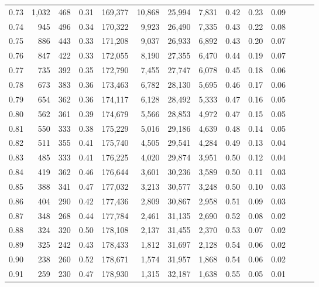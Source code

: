 \begin{tabular}{rrrrrrrrrrrrrr}
0.73 &  1,032 &  468 &  0.31 &  169,377 &   10,868 &  25,994 &   7,831 &  0.42 &  0.23 &      0.09 \\
0.74 &    945 &  496 &  0.34 &  170,322 &    9,923 &  26,490 &   7,335 &  0.43 &  0.22 &      0.08 \\
0.75 &    886 &  443 &  0.33 &  171,208 &    9,037 &  26,933 &   6,892 &  0.43 &  0.20 &      0.07 \\
0.76 &    847 &  422 &  0.33 &  172,055 &    8,190 &  27,355 &   6,470 &  0.44 &  0.19 &      0.07 \\
0.77 &    735 &  392 &  0.35 &  172,790 &    7,455 &  27,747 &   6,078 &  0.45 &  0.18 &      0.06 \\
0.78 &    673 &  383 &  0.36 &  173,463 &    6,782 &  28,130 &   5,695 &  0.46 &  0.17 &      0.06 \\
0.79 &    654 &  362 &  0.36 &  174,117 &    6,128 &  28,492 &   5,333 &  0.47 &  0.16 &      0.05 \\
0.80 &    562 &  361 &  0.39 &  174,679 &    5,566 &  28,853 &   4,972 &  0.47 &  0.15 &      0.05 \\
0.81 &    550 &  333 &  0.38 &  175,229 &    5,016 &  29,186 &   4,639 &  0.48 &  0.14 &      0.05 \\
0.82 &    511 &  355 &  0.41 &  175,740 &    4,505 &  29,541 &   4,284 &  0.49 &  0.13 &      0.04 \\
0.83 &    485 &  333 &  0.41 &  176,225 &    4,020 &  29,874 &   3,951 &  0.50 &  0.12 &      0.04 \\
0.84 &    419 &  362 &  0.46 &  176,644 &    3,601 &  30,236 &   3,589 &  0.50 &  0.11 &      0.03 \\
0.85 &    388 &  341 &  0.47 &  177,032 &    3,213 &  30,577 &   3,248 &  0.50 &  0.10 &      0.03 \\
0.86 &    404 &  290 &  0.42 &  177,436 &    2,809 &  30,867 &   2,958 &  0.51 &  0.09 &      0.03 \\
0.87 &    348 &  268 &  0.44 &  177,784 &    2,461 &  31,135 &   2,690 &  0.52 &  0.08 &      0.02 \\
0.88 &    324 &  320 &  0.50 &  178,108 &    2,137 &  31,455 &   2,370 &  0.53 &  0.07 &      0.02 \\
0.89 &    325 &  242 &  0.43 &  178,433 &    1,812 &  31,697 &   2,128 &  0.54 &  0.06 &      0.02 \\
0.90 &    238 &  260 &  0.52 &  178,671 &    1,574 &  31,957 &   1,868 &  0.54 &  0.06 &      0.02 \\
0.91 &    259 &  230 &  0.47 &  178,930 &    1,315 &  32,187 &   1,638 &  0.55 &  0.05 &      0.01 \\

\end{tabular}
